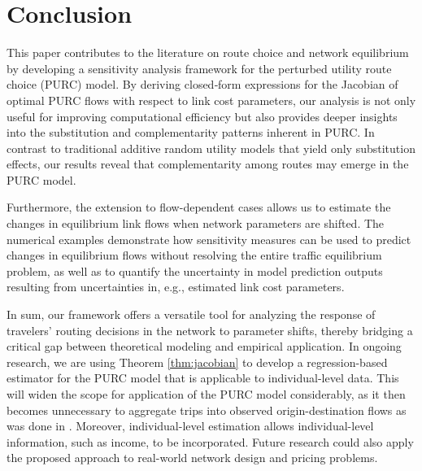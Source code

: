 \documentclass[a4paper,11pt]{article}
\begin{document}

\section{Conclusion}\label{sec:conclusion}

This paper contributes to the literature on route choice and network equilibrium by developing a sensitivity analysis framework for the perturbed utility route choice (PURC) model. By deriving closed‐form expressions for the Jacobian of optimal PURC flows with respect to link cost parameters, our analysis is not only useful for improving computational efficiency but also provides deeper insights into the substitution and complementarity patterns inherent in PURC. In contrast to traditional additive random utility models that yield only substitution effects, our results reveal that complementarity among routes may emerge in the PURC model. 

Furthermore, the extension to flow-dependent cases allows us to estimate the changes in equilibrium link flows when network parameters are shifted. The numerical examples demonstrate how sensitivity measures can be used to predict changes in equilibrium flows without resolving the entire traffic equilibrium problem, as well as to quantify the uncertainty in model prediction outputs resulting from uncertainties in, e.g., estimated link cost parameters.

In sum, our framework offers a versatile tool for analyzing the response of travelers' routing decisions in the network to parameter shifts, thereby bridging a critical gap between theoretical modeling and empirical application. 
In ongoing research, we are using Theorem \ref{thm:jacobian} to develop a regression-based estimator for the PURC model that is applicable to individual-level data. This will widen the scope for application of the PURC model considerably, as it then becomes unnecessary to aggregate trips into observed origin-destination flows as was done in \citet{Fosgerau2021a}. Moreover, individual-level estimation allows individual-level information, such as income, to be incorporated. Future research could also apply the proposed approach to real-world network design and pricing problems.
\end{document}
